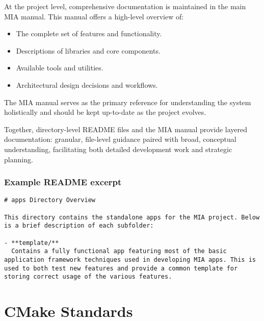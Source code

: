 At the project level, comprehensive documentation is maintained in the main MIA manual. This manual offers a high-level overview of:
\begin{itemize}\itemsep0em
    \item The complete set of features and functionality.
    \item Descriptions of libraries and core components.
    \item Available tools and utilities.
    \item Architectural design decisions and workflows.
\end{itemize}
The MIA manual serves as the primary reference for understanding the system holistically and should be kept up-to-date as the project evolves.

Together, directory-level README files and the MIA manual provide layered documentation: granular, file-level guidance paired with broad, conceptual understanding, facilitating both detailed development work and strategic planning.

\subsubsection*{Example README excerpt}

\begin{lstlisting}[style=cppstyle]
# apps Directory Overview

This directory contains the standalone apps for the MIA project. Below is a brief description of each subfolder:
  
- **template/**  
  Contains a fully functional app featuring most of the basic application framework techniques used in developing MIA apps. This is used to both test new features and provide a common template for storing correct usage of the various features.
\end{lstlisting}









\section{CMake Standards}

